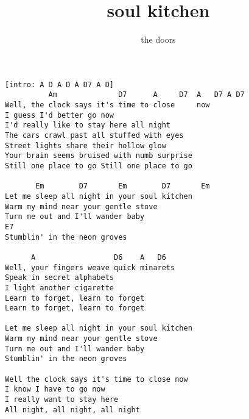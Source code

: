 \author{the doors}
\title{soul kitchen}
\maketitle
\begin{verbatim}
[intro: A D A D A D7 A D]
          Am              D7      A     D7  A   D7 A D7
Well, the clock says it's time to close     now
I guess I'd better go now
I'd really like to stay here all night
The cars crawl past all stuffed with eyes
Street lights share their hollow glow
Your brain seems bruised with numb surprise
Still one place to go Still one place to go

       Em        D7       Em        D7       Em
Let me sleep all night in your soul kitchen
Warm my mind near your gentle stove
Turn me out and I'll wander baby
E7
Stumblin' in the neon groves

      A                  D6    A   D6
Well, your fingers weave quick minarets
Speak in secret alphabets
I light another cigarette
Learn to forget, learn to forget
Learn to forget, learn to forget

Let me sleep all night in your soul kitchen
Warm my mind near your gentle stove
Turn me out and I'll wander baby
Stumblin' in the neon groves

Well the clock says it's time to close now
I know I have to go now
I really want to stay here 
All night, all night, all night
\end{verbatim}